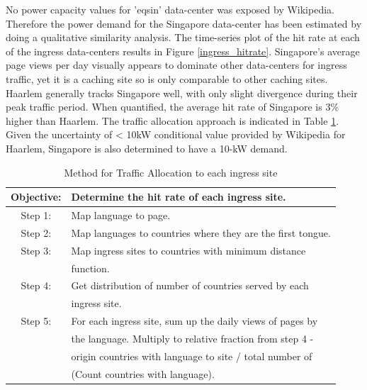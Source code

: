 \documentclass[conference]{IEEEtran}
\begin{document}
No power capacity values for 'eqsin' data-center was exposed by Wikipedia. Therefore the power demand for the Singapore data-center has been estimated by doing a qualitative similarity analysis. The time-series plot of the hit rate at each of the ingress data-centers results in Figure \ref{ingress_hitrate}. Singapore's average page views per day visually appears to dominate other data-centers for ingress traffic, yet it is a caching site so is only comparable to other caching sites. Haarlem generally tracks Singapore well, with only slight divergence during their peak traffic period. When quantified, the average hit rate of Singapore is 3\% higher than Haarlem. The traffic allocation approach is indicated in Table \ref{ingress_sites}. Given the uncertainty of < 10kW conditional value provided by Wikipedia for Haarlem, Singapore is also determined to have a 10-kW demand. 


\begin{table}[htbp]
\caption{Method for Traffic Allocation to each ingress site}
\begin{center}
\begin{tabular}{cl}
Objective: & Determine the hit rate of each ingress site.                 \\
\hline 
Step 1:    & Map language to page.                                        \\
Step 2:    & Map languages to countries where they are the first tongue.  \\
Step 3:    & Map ingress sites to countries with minimum distance         \\
           & function.                                                    \\
Step 4:    & Get distribution of  number of countries served by each      \\
           & ingress site.                                                \\
Step 5:    & For each ingress site, sum up the daily views of pages by    \\
           & the language. Multiply to relative fraction from step 4 -    \\
           & origin countries  with language to site / total number of    \\
           & (Count countries with language).                             \\  
         

\end{tabular}
\label{ingress_sites}
\end{center}
\end{table}
\end{document}
